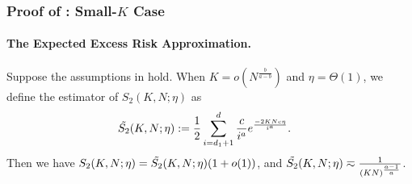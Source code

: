 

\subsubsection{Proof of : Small-$K$ Case} \label{sec:proof-power-spectrum-Ek-small}

\paragraph{The Expected Excess Risk Approximation.}
\begin{lemma} \label{lem:one-hot-loss-estimate-small-K}
    Suppose the assumptions in  hold. When $K = o(N^{\frac{b}{a-b}})$ and $\eta = \Theta(1)$, we define the estimator of $S_2(K, N;\eta)$ as
    \begin{align*}
        \Tilde{S_2}(K, N;\eta) &:= \frac{1}{2}\sum_{i=d_1+1}^{d}\frac{c}{i^{a}}e^{\frac{-2KNc\eta}{i^{a}}}.
    \end{align*}
    Then we have $S_2(K, N;\eta)=\Tilde{S_2}(K, N;\eta)(1+o(1))$, and 
    $\Tilde{S_2}(K, N;\eta) \eqsim \frac{1}{(KN)^{\frac{a-1}{a}}}$.
\end{lemma}

